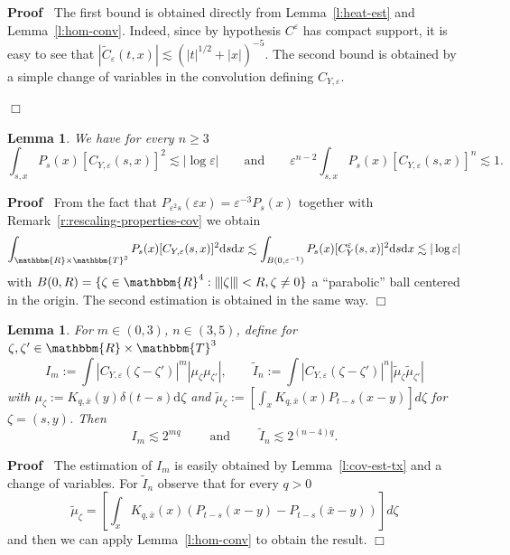 \documentclass[a4paper,11pt]{article}
\newcommand{\assign}{:=}
\newcommand{\mathd}{\mathrm{d}}
\newcommand{\tmop}[1]{\ensuremath{\operatorname{#1}}}
\newenvironment{proof}{\noindent\textbf{Proof\ }}{\hspace*{\fill}$\Box$\medskip}
\newtheorem{lemma}[theorem]{Lemma}
{\theorembodyfont{\rmfamily}\newtheorem{remark}[theorem]{Remark}}
\begin{document}
\begin{proof}
  The first bound is obtained directly from Lemma~\ref{l:heat-est} and
  Lemma~\ref{l:hom-conv}. Indeed, since by hypothesis $C^{\varepsilon}$ has
  compact support, it is easy to see that $| \tilde{C}_{\varepsilon} (t, x) |
  \lesssim (| t |^{1 / 2} + | x |)^{- 5}$. The second bound is obtained by a
  simple change of variables in the convolution defining $C_{Y, \varepsilon}$.
  
\end{proof}

\begin{lemma}
  \label{l:PC-integrals}
  We have for every $n \geqslant 3$ 
  $$ \int_{s, x} P_s (x) [C_{Y, \varepsilon} (s,
  x)]^2 \lesssim | \log \varepsilon | \qquad \mbox{and} \qquad
  \varepsilon^{n - 2} \int_{s, x} P_s (x) [C_{Y, \varepsilon} (s, x)]^n
  \lesssim 1.$$
\end{lemma}

\begin{proof}
  From the fact that $P_{\varepsilon^2 s} (\varepsilon x) = \varepsilon^{- 3}
  P_s (x)$ together with Remark~\ref{r:rescaling-properties-cov} we obtain
  \[ \int_{\mathbbm{R} \times \mathbbm{T}^3} P_s (x) [C_{Y, \varepsilon} (s,
     x)]^2 \mathd s \mathd x \lesssim \int_{B (0, \varepsilon^{- 1})} P_s (x)
     [C_Y^{\varepsilon} (s, x)]^2 \mathd s \mathd x \lesssim | \log
     \varepsilon | \]
  with $B (0, R) = \{\zeta \in \mathbbm{R}^4 : \interleave \zeta \interleave <
  R, \zeta \neq 0\}$ a ``parabolic'' ball centered in the origin. The second
  estimation is obtained in the same way.
\end{proof}

\begin{lemma}
  \label{l:integral-firstorder-est} For $m \in (0, 3)$, $n \in (3, 5)$, define
  for $\zeta, \zeta' \in \mathbbm{R} \times \mathbbm{T}^3$
  \[ I_m \assign \int | C_{Y, \varepsilon} (\zeta - \zeta') |^m  | \mu_{\zeta}
     \mu_{\zeta'} |, \qquad \tilde{I}_n \assign \int | C_{Y, \varepsilon}
     (\zeta - \zeta') |^n  | \tilde{\mu}_{\zeta}  \tilde{\mu}_{\zeta'} | \]
  with $\mu_{\zeta} \assign K_{q, \bar{x}} (y) \delta (t - s) \mathd \zeta$
  and $\tilde{\mu}_{\zeta} \assign \left[ \int_x K_{q, \bar{x}} (x) P_{t - s}
  (x - y) \right] d \zeta$ for $\zeta = (s, y)$. Then
  \[ I_m \lesssim 2^{mq} \qquad \tmop{and} \qquad \tilde{I}_n \lesssim 2^{(n -
     4) q} . \]
\end{lemma}

\begin{proof}
  The estimation of $I_m$ is easily obtained by Lemma~\ref{l:cov-est-tx} and a
  change of variables. For $\tilde{I}_n$ observe that for every $q > 0$
  \[ \tilde{\mu}_{\zeta} = [\int_x K_{q, \bar{x}} (x) (P_{t - s} (x - y) -
     P_{t - s} (\bar{x} - y))] d \zeta \]
  and then we can apply Lemma~\ref{l:hom-conv} to obtain the result.
\end{proof}
\end{document}
